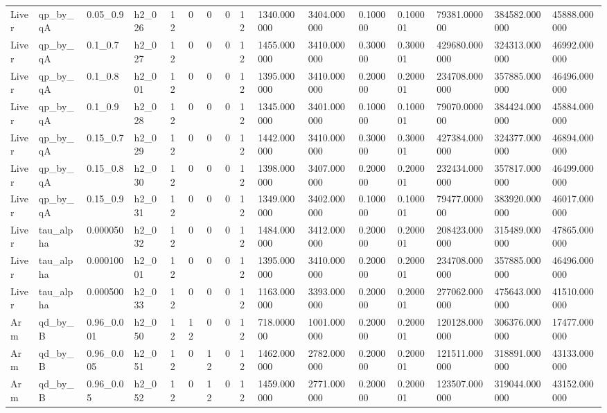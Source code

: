 \begin{tabular}{llllllllllllllll}
Liver & qp\_by\_qA & 0.05\_0.9 & h2\_026 & 12 & 0 & 0 & 0 & 12 & 1340.000000 & 3404.000000 & 0.100000 & 0.100001 & 79381.000000 & 384582.000000 & 45888.000000 \\
Liver & qp\_by\_qA & 0.1\_0.7 & h2\_027 & 12 & 0 & 0 & 0 & 12 & 1455.000000 & 3410.000000 & 0.300000 & 0.300001 & 429680.000000 & 324313.000000 & 46992.000000 \\
Liver & qp\_by\_qA & 0.1\_0.8 & h2\_001 & 12 & 0 & 0 & 0 & 12 & 1395.000000 & 3410.000000 & 0.200000 & 0.200001 & 234708.000000 & 357885.000000 & 46496.000000 \\
Liver & qp\_by\_qA & 0.1\_0.9 & h2\_028 & 12 & 0 & 0 & 0 & 12 & 1345.000000 & 3401.000000 & 0.100000 & 0.100001 & 79070.000000 & 384424.000000 & 45884.000000 \\
Liver & qp\_by\_qA & 0.15\_0.7 & h2\_029 & 12 & 0 & 0 & 0 & 12 & 1442.000000 & 3410.000000 & 0.300000 & 0.300001 & 427384.000000 & 324377.000000 & 46894.000000 \\
Liver & qp\_by\_qA & 0.15\_0.8 & h2\_030 & 12 & 0 & 0 & 0 & 12 & 1398.000000 & 3407.000000 & 0.200000 & 0.200001 & 232434.000000 & 357817.000000 & 46499.000000 \\
Liver & qp\_by\_qA & 0.15\_0.9 & h2\_031 & 12 & 0 & 0 & 0 & 12 & 1349.000000 & 3402.000000 & 0.100000 & 0.100001 & 79477.000000 & 383920.000000 & 46017.000000 \\
Liver & tau\_alpha & 0.000050 & h2\_032 & 12 & 0 & 0 & 0 & 12 & 1484.000000 & 3412.000000 & 0.200000 & 0.200001 & 208423.000000 & 315489.000000 & 47865.000000 \\
Liver & tau\_alpha & 0.000100 & h2\_001 & 12 & 0 & 0 & 0 & 12 & 1395.000000 & 3410.000000 & 0.200000 & 0.200001 & 234708.000000 & 357885.000000 & 46496.000000 \\
Liver & tau\_alpha & 0.000500 & h2\_033 & 12 & 0 & 0 & 0 & 12 & 1163.000000 & 3393.000000 & 0.200000 & 0.200001 & 277062.000000 & 475643.000000 & 41510.000000 \\
Arm & qd\_by\_B & 0.96\_0.001 & h2\_050 & 12 & 12 & 0 & 0 & 12 & 718.000000 & 1001.000000 & 0.200000 & 0.200001 & 120128.000000 & 306376.000000 & 17477.000000 \\
Arm & qd\_by\_B & 0.96\_0.005 & h2\_051 & 12 & 0 & 12 & 0 & 12 & 1462.000000 & 2782.000000 & 0.200000 & 0.200001 & 121511.000000 & 318891.000000 & 43133.000000 \\
Arm & qd\_by\_B & 0.96\_0.05 & h2\_052 & 12 & 0 & 12 & 0 & 12 & 1459.000000 & 2771.000000 & 0.200000 & 0.200001 & 123507.000000 & 319044.000000 & 43152.000000 \\

\end{tabular}
